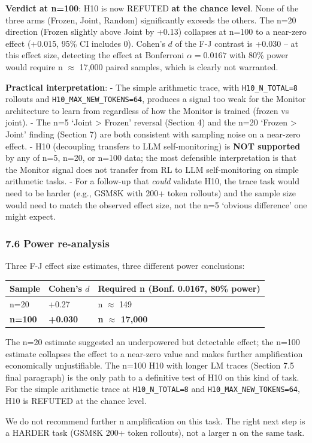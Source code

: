 \documentclass[
]{article}
\newcounter{none} %
\begin{document}
\textbf{Verdict at n=100}: H10 is now REFUTED \textbf{at the chance
level}. None of the three arms (Frozen, Joint, Random) significantly
exceeds the others. The n=20 direction (Frozen slightly above Joint by
+0.13) collapses at n=100 to a near-zero effect (+0.015, 95\% CI
includes 0). Cohen's \(d\) of the F-J contrast is +0.030 -- at this
effect size, detecting the effect at Bonferroni \(\alpha=0.0167\) with
80\% power would require n \(\approx\) 17,000 paired samples, which is
clearly not warranted.

\textbf{Practical interpretation}: - The simple arithmetic trace, with
\texttt{H10\_N\_TOTAL=8} rollouts and \texttt{H10\_MAX\_NEW\_TOKENS=64},
produces a signal too weak for the Monitor architecture to learn from
regardless of how the Monitor is trained (frozen vs joint). - The n=5
`Joint \textgreater{} Frozen' reversal (Section 4) and the n=20 `Frozen
\textgreater{} Joint' finding (Section 7) are both consistent with
sampling noise on a near-zero effect. - H10 (decoupling transfers to LLM
self-monitoring) is \textbf{NOT supported} by any of n=5, n=20, or n=100
data; the most defensible interpretation is that the Monitor signal does
not transfer from RL to LLM self-monitoring on simple arithmetic tasks.
- For a follow-up that \emph{could} validate H10, the trace task would
need to be harder (e.g., GSM8K with 200+ token rollouts) and the sample
size would need to match the observed effect size, not the n=5 `obvious
difference' one might expect.

\subsubsection{7.6 Power re-analysis}\label{power-re-analysis-1}

Three F-J effect size estimates, three different power conclusions:

{\def\LTcaptype{none} %
\begin{longtable}[]{@{}lll@{}}
\toprule\noalign{}
Sample & Cohen's \(d\) & Required n (Bonf. 0.0167, 80\% power) \\
\midrule\noalign{}
\endhead
\bottomrule\noalign{}
\endlastfoot
n=20 & +0.27 & n \(\approx\) 149 \\
\textbf{n=100} & \textbf{+0.030} & \textbf{n \(\approx\) 17,000} \\
\end{longtable}
}

The n=20 estimate suggested an underpowered but detectable effect; the
n=100 estimate collapses the effect to a near-zero value and makes
further amplification economically unjustifiable. The n=100 H10 with
longer LM traces (Section 7.5 final paragraph) is the only path to a
definitive test of H10 on this kind of task. For the simple arithmetic
trace at \texttt{H10\_N\_TOTAL=8} and \texttt{H10\_MAX\_NEW\_TOKENS=64},
H10 is REFUTED at the chance level.

We do not recommend further n amplification on this task. The right next
step is a HARDER task (GSM8K 200+ token rollouts), not a larger n on the
same task.
\end{document}
